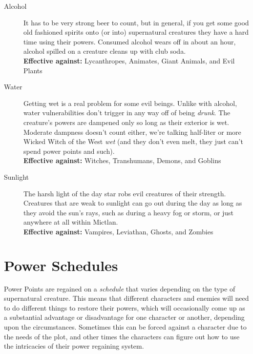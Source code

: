 \begin{description}
\item[Alcohol]
It has to be very strong beer to count, but in general, if you get some good old fashioned spirits onto (or into) supernatural creatures they have a hard time using their powers. Consumed alcohol wears off in about an hour, alcohol spilled on a creature cleans up with club soda.\\
\textbf{Effective against:} Lycanthropes, Animates, Giant Animals, and Evil Plants

\item[Water]
Getting wet is a real problem for some evil beings. Unlike with alcohol, water vulnerabilities don't trigger in any way off of being \textit{drunk}. The creature's powers are dampened only so long as their exterior is wet. Moderate dampness doesn't count either, we're talking half-liter or more Wicked Witch of the West \textit{wet} (and they don't even melt, they just can't spend power points and such).\\
\textbf{Effective against:} Witches, Transhumans, Demons, and Goblins

\item[Sunlight]
The harsh light of the day star robs evil creatures of their strength. Creatures that are weak to sunlight can go out during the day as long as they avoid the sun's rays, such as during a heavy fog or storm, or just anywhere at all within Mictlan.\\
\textbf{Effective against:} Vampires, Leviathan, Ghosts, and Zombies
\end{description}

\section{Power Schedules}

Power Points are regained on a \textit{schedule} that varies depending on the type of supernatural creature. This means that different characters and enemies will need to do different things to restore their powers, which will occasionally come up as a substantial advantage or disadvantage for one character or another, depending upon the circumstances. Sometimes this can be forced against a character due to the needs of the plot, and other times the characters can figure out how to use the intricacies of their power regaining system.

